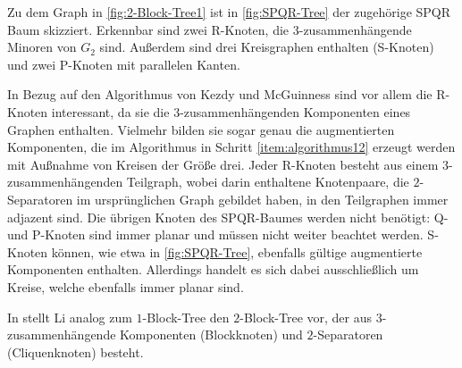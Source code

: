 Zu dem Graph in \Abb \ref{fig:2-Block-Tree1} ist in \Abb \ref{fig:SPQR-Tree} der zugehörige SPQR Baum skizziert.
Erkennbar sind zwei R-Knoten, die $3$-zusammenhängende Minoren von $G_2$ sind.
Außerdem sind drei Kreisgraphen enthalten (S-Knoten) und zwei P-Knoten mit parallelen Kanten. %

In Bezug auf den Algorithmus von Kezdy und McGuinness sind vor allem die R-Knoten interessant, da sie die $3$-zusammenhängenden Komponenten eines Graphen enthalten.
Vielmehr bilden sie sogar genau die augmentierten Komponenten, die im Algorithmus in Schritt \ref{item:algorithmus12} erzeugt werden mit Außnahme von Kreisen der Größe drei.
Jeder R-Knoten besteht aus einem $3$-zusammenhängenden Teilgraph, wobei darin enthaltene Knotenpaare, die $2$-Separatoren im ursprünglichen Graph gebildet haben, in den Teilgraphen immer adjazent sind.
Die übrigen Knoten des SPQR-Baumes werden nicht benötigt:
Q- und P-Knoten sind immer planar und müssen nicht weiter beachtet werden.
S-Knoten können, wie etwa in \Abb \ref{fig:SPQR-Tree}, ebenfalls gültige augmentierte Komponenten enthalten.
Allerdings handelt es sich dabei ausschließlich um Kreise, welche ebenfalls immer planar sind.

In \cite{Li11} stellt Li analog zum $1$-Block-Tree den $2$-Block-Tree vor, der aus $3$-zusammenhängende Komponenten (Blockknoten) und $2$-Separatoren (Cliquenknoten) besteht.

